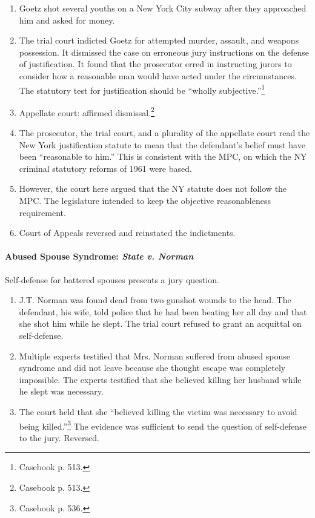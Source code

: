 \begin{enumerate}
    \item Goetz shot several youths on a New York City subway after they 
    approached him and asked for money.
    \item The trial court indicted Goetz for attempted murder, assault, and 
    weapons possession. It dismissed the case on erroneous jury instructions 
    on the defense of justification. It found that the prosecutor erred in 
    instructing jurors to consider how a reasonable man would have acted under 
    the circumstances. The statutory test for justification should be ``wholly 
    subjective.''\footnote{Casebook p. 513.}
    \item Appellate court: affirmed dismissal.\footnote{Casebook p. 513.}
    \item The prosecutor, the trial court, and a plurality of the appellate 
    court read the New York justification statute to mean that the defendant's 
    belief must have been ``reasonable to him.'' This is consistent with the 
    MPC, on which the NY criminal statutory reforms of 1961 were based.
    \item However, the court here argued that the NY statute does not follow 
    the MPC. The legislature intended to keep the objective reasonableness 
    requirement.
    \item Court of Appeals reversed and reinstated the indictments.
\end{enumerate}

\paragraph{Abused Spouse Syndrome: \emph{State v. Norman}}

Self-defense for battered spouses presents a jury question.

\begin{enumerate}
    \item J.T. Norman was found dead from two gunshot wounds to the head. The 
    defendant, his wife, told police that he had been beating her all day and 
    that she shot him while he slept. The trial court refused to grant an 
    acquittal on self-defense.
    \item Multiple experts testified that Mrs. Norman suffered from abused 
    spouse syndrome and did not leave because she thought escape was 
    completely impossible. The experts testified that she believed killing 
    her husband while he slept was necessary.
    \item The court held that she ``believed killing the victim was necessary 
    to avoid being killed.''\footnote{Casebook p. 536.} The evidence was 
    sufficient to send the question of self-defense to the jury. Reversed.
\end{enumerate}

